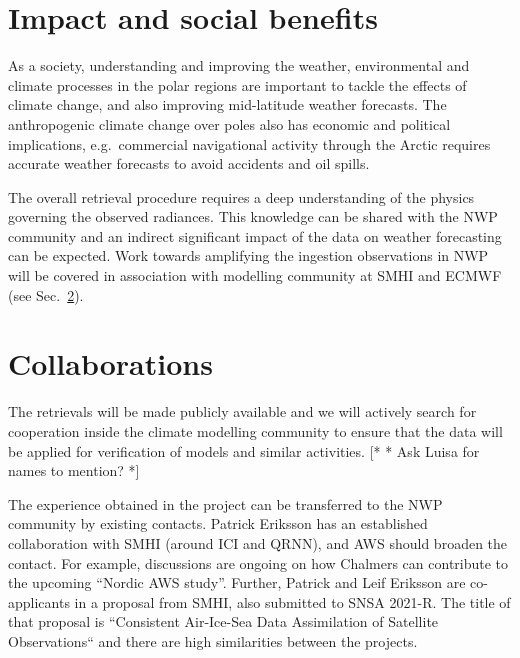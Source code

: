 \documentclass[12pt,oneside,a4paper]{article}
\newcommand\intodo[1]{{\color{red} [* #1 *]}}
\begin{document}
\section{Impact and social benefits}
%
\label{sec:impact}

As a society, understanding and improving the weather, environmental and
climate processes in the polar regions are important to tackle the effects
of climate change, and also improving mid-latitude weather forecasts. The
anthropogenic climate change over poles also has economic and political
implications, e.g.\ commercial navigational activity through the Arctic
requires accurate weather forecasts to avoid accidents and oil spills.

The overall retrieval procedure requires a deep understanding of the physics
governing the observed radiances. This knowledge can be shared with the NWP
community and an indirect significant impact of the data on weather forecasting
can be expected. Work towards amplifying the ingestion observations in NWP will
be covered in association with modelling community at SMHI and ECMWF (see
Sec.~\ref{sec:collaborations}).

\newpage



\section{Collaborations}
%
\label{sec:collaborations}
The retrievals will be made publicly available and we will actively search
for cooperation inside the climate modelling community to ensure that the 
data will be applied for verification of models and similar activities. \intodo{* Ask
Luisa for names to mention?}

The experience obtained in the project can be transferred to the NWP community
by existing contacts. Patrick Eriksson has an established collaboration with
SMHI (around ICI and QRNN), and AWS should broaden the contact. For example,
discussions are ongoing on how Chalmers can contribute to the upcoming
``Nordic AWS study''. Further, Patrick and Leif Eriksson are co-applicants in a
proposal from SMHI, also submitted to SNSA 2021-R. The title of that proposal
is ``Consistent Air-Ice-Sea Data Assimilation of Satellite Observations`` and
there are high similarities between the projects.
\end{document}
